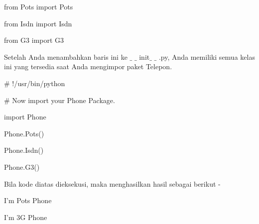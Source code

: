 \vspace{\baselineskip}
\noindent \hspace*{0.5in}from Pots import Pots\par


\noindent \hspace*{0.5in}from Isdn import Isdn\par


\noindent \hspace*{0.5in}from G3 import G3\par


\vspace{\baselineskip}
\noindent Setelah Anda menambahkan baris ini ke $ \_ $ $ \_ $ init$ \_ $ $ \_ $ .py, Anda memiliki semua kelas ini yang tersedia saat Anda mengimpor paket Telepon.\par
\vspace{\baselineskip}
\noindent \hspace*{0.5in}$\#$ !/usr/bin/python\par

\noindent \hspace*{0.5in}$\#$  Now import your Phone Package.\par

\noindent \hspace*{0.5in}import Phone\par

\vspace{\baselineskip}
\noindent \hspace*{0.5in}Phone.Pots()\par

\noindent \hspace*{0.5in}Phone.Isdn()\par

\noindent \hspace*{0.5in}Phone.G3()\par

\vspace{\baselineskip}
\noindent Bila kode diatas dieksekusi, maka menghasilkan hasil sebagai berikut -\par

\vspace{\baselineskip}
\noindent \hspace*{0.5in}I'm Pots Phone\par


\noindent \hspace*{0.5in}I'm 3G Phone\par


